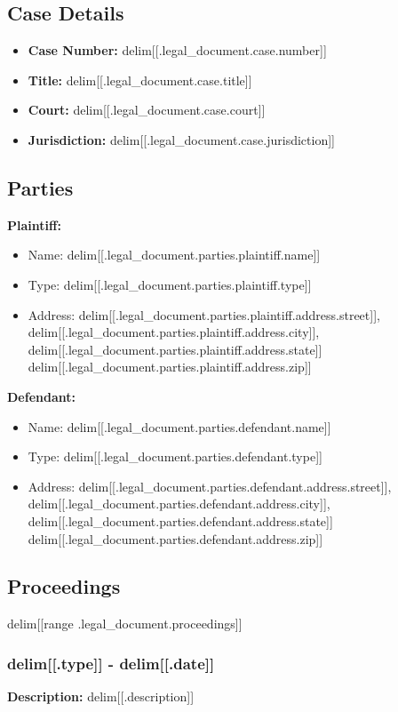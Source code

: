 \documentclass[12pt,a4paper]{article}
\begin{document}
\subsection{Case Details}
\begin{itemize}
    \item \textbf{Case Number:} delim[[.legal_document.case.number]]
    \item \textbf{Title:} delim[[.legal_document.case.title]]
    \item \textbf{Court:} delim[[.legal_document.case.court]]
    \item \textbf{Jurisdiction:} delim[[.legal_document.case.jurisdiction]]
\end{itemize}

\subsection{Parties}

\textbf{Plaintiff:}
\begin{itemize}
    \item Name: delim[[.legal_document.parties.plaintiff.name]]
    \item Type: delim[[.legal_document.parties.plaintiff.type]]
    \item Address: delim[[.legal_document.parties.plaintiff.address.street]], delim[[.legal_document.parties.plaintiff.address.city]], delim[[.legal_document.parties.plaintiff.address.state]] delim[[.legal_document.parties.plaintiff.address.zip]]
\end{itemize}

\textbf{Defendant:}
\begin{itemize}
    \item Name: delim[[.legal_document.parties.defendant.name]]
    \item Type: delim[[.legal_document.parties.defendant.type]]
    \item Address: delim[[.legal_document.parties.defendant.address.street]], delim[[.legal_document.parties.defendant.address.city]], delim[[.legal_document.parties.defendant.address.state]] delim[[.legal_document.parties.defendant.address.zip]]
\end{itemize}

\subsection{Proceedings}

delim[[range .legal_document.proceedings]]
\subsubsection{delim[[.type]] - delim[[.date]]}
\textbf{Description:} delim[[.description]]
\end{document}
